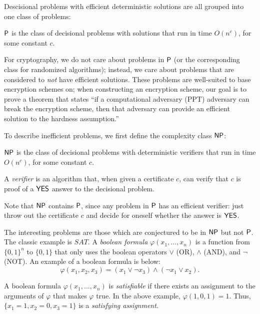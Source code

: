     Descisional problems with efficient deterministic solutions are all grouped into one class of problems:
    \begin{definition}

        ${\sf P}$ is the class of decisional problems with solutions that run in time $O(n^c)$, for some constant $c$.
    \end{definition}

    For cryptography, we do not care about problems in ${\sf P}$ (or the corresponding class for randomized algorithms); instead, we care about problems that are considered to \emph{not} have efficient solutions. These problems are well-suited to base encryption schemes on; when constructing an encryption scheme, our goal is to prove a theorem that states ``if a computational adversary (PPT) adversary can break the encryption scheme, then that adversary can provide an efficient solution to the hardness assumption.''

    To describe inefficient problems, we first define the complexity class ${\sf NP}$:
    \begin{definition}

        ${\sf NP}$ is the class of decisional problems with deterministic verifiers that run in time $O(n^c)$, for some constant $c$.
    \end{definition}

    A \emph{verifier} is an algorithm that, when given a certificate $c$, can verify that $c$ is proof of a ${\sf YES}$ answer to the decisional problem.

    Note that ${\sf NP}$ contains ${\sf P}$, since any problem in ${\sf P}$ has an efficient verifier: just throw out the certificate $c$ and decide for oneself whether the answer is ${\sf YES}$.

    The interesting problems are those which are conjectured to be in ${\sf NP}$ but not ${\sf P}$. The classic example is $\textit{SAT}$. A \emph{boolean formula} $\varphi(x_1, \dots, x_n)$ is a function from $\{0, 1\}^n$ to $\{0, 1\}$ that only uses the boolean operators $\vee$ (OR), $\wedge$ (AND), and $\neg$ (NOT). An example of a boolean formula is below:
    \[\varphi(x_1, x_2, x_3) = (x_1 \vee \neg x_3) \wedge (\neg x_1 \vee x_2).\]

    A boolean formula $\varphi(x_1, \dots, x_n)$ is \emph{satisfiable} if there exists an assignment to the arguments of $\varphi$ that makes $\varphi$ true. In the above example, $\varphi(1, 0, 1) = 1$. Thus, $\{x_1 = 1, x_2 = 0, x_3 = 1\}$ is a \emph{satisfying assignment}.

